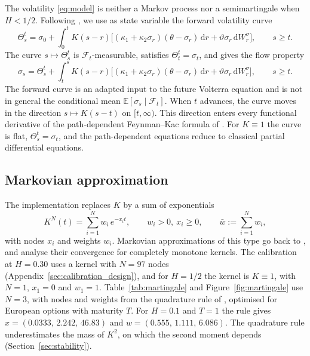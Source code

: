 \documentclass[11pt,a4paper]{article}
\theoremstyle{definition}
\newcommand{\D}{\mathrm{d}}
\newcommand{\E}{\mathbb{E}}
\newcommand{\F}{\mathcal{F}}
\begin{document}
The volatility \eqref{eq:model} is neither a Markov process nor a semimartingale when $H<1/2$. Following \citet{ViensZhang2019}, we use as state variable the forward volatility curve
\begin{equation}\label{eq:theta_curve}
\Theta^t_s=\sigma_0+\int_0^t K(s-r)\Big[(\kappa_1+\kappa_2\sigma_r)(\theta-\sigma_r)\,\D r+\vartheta\sigma_r\,\D W^\sigma_r\Big],\qquad s\ge t .
\end{equation}
The curve $s\mapsto\Theta^t_s$ is $\F_t$-measurable, satisfies $\Theta^t_t=\sigma_t$, and gives the flow property
\begin{equation}\label{eq:flow}
\sigma_s=\Theta^t_s+\int_t^s K(s-r)\Big[(\kappa_1+\kappa_2\sigma_r)(\theta-\sigma_r)\,\D r+\vartheta\sigma_r\,\D W^\sigma_r\Big],\qquad s\ge t .
\end{equation}
The forward curve is an adapted input to the future Volterra equation and is not in general the conditional mean $\E[\sigma_s\mid\F_t]$. When $t$ advances, the curve moves in the direction $s\mapsto K(s-t)$ on $[t,\infty)$. This direction enters every functional derivative of the path-dependent Feynman--Kac formula of \citet{ViensZhang2019}. For $K\equiv1$ the curve is flat, $\Theta^t_s=\sigma_t$, and the path-dependent equations reduce to classical partial differential equations.

\subsection{Markovian approximation}

The implementation replaces $K$ by a sum of exponentials
\begin{equation}\label{eq:kernel_N}
K^N(t)=\sum_{i=1}^N w_i\,e^{-x_i t},\qquad w_i>0,\ x_i\ge0,\qquad \bar w:=\sum_{i=1}^N w_i ,
\end{equation}
with nodes $x_i$ and weights $w_i$. Markovian approximations of this type go back to \citet{AbiJaberElEuch2019}, and \citet{AlfonsiKebaier2024} analyse their convergence for completely monotone kernels. The calibration at $H=0.30$ uses a kernel with $N=97$ nodes (Appendix~\ref{sec:calibration_design}), and for $H=1/2$ the kernel is $K\equiv1$, with $N=1$, $x_1=0$ and $w_1=1$. Table~\ref{tab:martingale} and Figure~\ref{fig:martingale} use $N=3$, with nodes and weights from the quadrature rule of \citet{BayerBreneis2023}, optimised for European options with maturity $T$. For $H=0.1$ and $T=1$ the rule gives $x=(0.0333,\,2.242,\,46.83)$ and $w=(0.555,\,1.111,\,6.086)$.
The quadrature rule underestimates the mass of $K^2$, on which the second moment depends (Section~\ref{sec:stability}).
\end{document}
